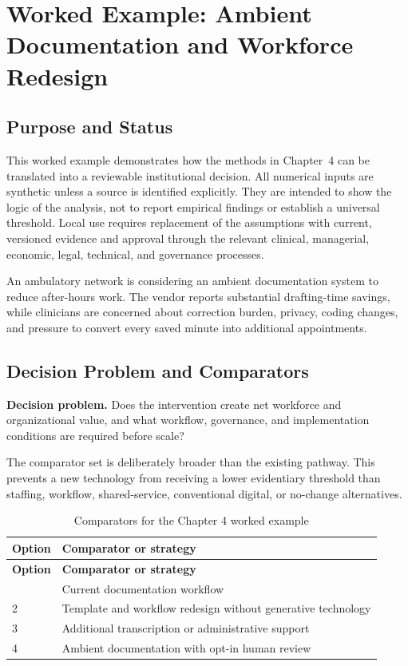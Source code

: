 \section{Worked Example: Ambient Documentation and Workforce Redesign}
\label{sec:comp-ch04-worked-example}

\subsection{Purpose and Status}
This worked example demonstrates how the methods in Chapter~4 can be
translated into a reviewable institutional decision. All numerical inputs are
synthetic unless a source is identified explicitly. They are intended to show the
logic of the analysis, not to report empirical findings or establish a universal
threshold. Local use requires replacement of the assumptions with current,
versioned evidence and approval through the relevant clinical, managerial,
economic, legal, technical, and governance processes.

An ambulatory network is considering an ambient documentation system to reduce after-hours work. The vendor reports substantial drafting-time savings, while clinicians are concerned about correction burden, privacy, coding changes, and pressure to convert every saved minute into additional appointments. 

\subsection{Decision Problem and Comparators}
\textbf{Decision problem.} Does the intervention create net workforce and organizational value, and what workflow, governance, and implementation conditions are required before scale?

The comparator set is deliberately broader than the existing pathway. This prevents
a new technology from receiving a lower evidentiary threshold than staffing,
workflow, shared-service, conventional digital, or no-change alternatives.

\begin{longtable}{@{}p{}p{}@{}}
\caption{Comparators for the Chapter 4 worked example}
\label{tab:comp-ch04-comparators}\\
\toprule
\textbf{Option} & \textbf{Comparator or strategy} \\
\midrule
\endfirsthead
\toprule
\textbf{Option} & \textbf{Comparator or strategy} \\
\midrule
\endhead
\bottomrule
\endlastfoot
1 & Current documentation workflow \\
2 & Template and workflow redesign without generative technology \\
3 & Additional transcription or administrative support \\
4 & Ambient documentation with opt-in human review \\
\end{longtable}

